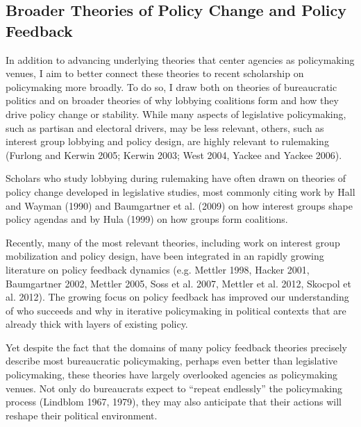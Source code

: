 \subsection{Broader Theories of Policy Change and Policy Feedback}


In addition to advancing underlying theories that center agencies as policymaking venues, I aim to better connect these theories to recent scholarship on policymaking more broadly. To do so, I draw both on theories of bureaucratic politics and on broader theories of why lobbying coalitions form and how they drive policy change or stability. While many aspects of legislative policymaking, such as partisan and electoral drivers, may be less relevant, others, such as interest group lobbying and policy design, are highly relevant to rulemaking (Furlong and Kerwin 2005; Kerwin 2003; West 2004, Yackee and Yackee 2006).

Scholars who study lobbying during rulemaking have often drawn on theories of policy change developed in legislative studies, most commonly citing work by Hall and Wayman (1990) and Baumgartner et al. (2009) on how interest groups shape policy agendas and by Hula (1999) on how groups form coalitions. 

Recently, many of the most relevant theories, including work on interest group mobilization and policy design, have been integrated in an rapidly growing literature on policy feedback dynamics (e.g. Mettler 1998, Hacker 2001, Baumgartner 2002, Mettler 2005, Soss et al. 2007, Mettler et al. 2012, Skocpol et al. 2012). The growing focus on policy feedback has improved our understanding of who succeeds and why in iterative policymaking in political contexts that are already thick with layers of existing policy. 

Yet despite the fact that the domains of many policy feedback theories precisely describe most bureaucratic policymaking, perhaps even better than legislative policymaking, these theories have largely overlooked agencies as policymaking venues. Not only do bureaucrats expect to ``repeat endlessly'' the policymaking process (Lindblom 1967, 1979), they may also anticipate that their actions will reshape their political environment. 



